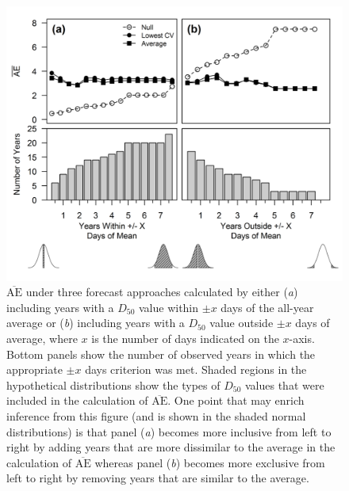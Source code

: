 \documentclass[12pt,]{book}
\theoremstyle{definition}
\theoremstyle{definition}
\theoremstyle{definition}
\theoremstyle{remark}
\begin{document}
\begin{figure}
  \centering
  \includegraphics{img/Ch2/mae-subsets.png}
  \caption{$\overline{\text{AE}}$ under three forecast approaches calculated by either (\textit{a}) including years with a $D_{50}$ value within $\pm x$  days of the all-year average or (\textit{b}) including years with a $D_{50}$ value outside $\pm x$ days of average, where $x$ is the number of days indicated on the $x$-axis. Bottom panels show the number of observed years in which the appropriate $\pm x$ days criterion was met. Shaded regions in the hypothetical distributions show the types of $D_{50}$ values that were included in the calculation of $\overline{\text{AE}}$. One point that may enrich inference from this figure (and is shown in the shaded normal distributions) is that panel (\textit{a}) becomes more inclusive from left to right by adding years that are more dissimilar to the average in the calculation of $\overline{\text{AE}}$ whereas panel (\textit{b}) becomes more exclusive from left to right by removing years that are similar to the average.}
  \label{fig:mae-subsets}
\end{figure}

\clearpage
\end{document}
